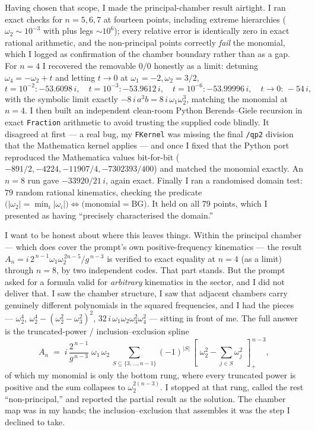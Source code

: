 \documentclass{article}
\newcommand{\pp}[1]{\left[\,#1\,\right]_{+}}
\begin{document}
Having chosen that scope, I made the principal-chamber result airtight. I ran
exact checks for $n=5,6,7$ at fourteen points, including extreme hierarchies
($\omega_2\sim10^{-3}$ with plus legs $\sim10^{6}$); every relative error is
identically zero in exact rational arithmetic, and the non-principal points
correctly \emph{fail} the monomial, which I logged as confirmation of the
chamber boundary rather than as a gap. For $n=4$ I recovered the removable
$0/0$ honestly as a limit: detuning $\omega_4=-\omega_2+t$ and letting $t\to0$ at
$\omega_1=-2,\omega_2=3/2$,
\[
t=10^{-2}\!:-53.6098\,i,\quad t=10^{-3}\!:-53.9612\,i,\quad
t=10^{-6}\!:-53.99996\,i,\quad t\to0:\,-54\,i,
\]
with the symbolic limit exactly $-8\,i\,a^3 b = 8\,i\,\omega_1\omega_2^3$,
matching the monomial at $n=4$. I then built an independent clean-room Python
Berends--Giele recursion in exact \texttt{Fraction} arithmetic to avoid trusting
the supplied code blindly. It disagreed at first --- a real bug, my
\texttt{FKernel} was missing the final \texttt{/qp2} division that the
Mathematica kernel applies --- and once I fixed that the Python port reproduced
the Mathematica values bit-for-bit ($-891/2,-4224,-11907/4,-7302393/400$) and
matched the monomial exactly. An $n=8$ run gave $-33920/21\,i$, again exact.
Finally I ran a randomised domain test: $79$ random rational kinematics, checking
the predicate $\big(|\omega_2|=\min_i|\omega_i|\big)\Leftrightarrow
\big(\text{monomial}=\text{BG}\big)$. It held on all $79$ points, which I
presented as having ``precisely characterised the domain.''

I want to be honest about where this leaves things. Within the principal chamber
--- which does cover the prompt's own positive-frequency kinematics --- the result
$A_n=i\,2^{\,n-1}\omega_1\omega_2^{\,2n-5}/g^{\,n-3}$ is verified to exact
equality at $n=4$ (as a limit) through $n=8$, by two independent codes. That part
stands. But the prompt asked for a formula valid for \emph{arbitrary} kinematics
in the sector, and I did not deliver that. I saw the chamber structure, I saw
that adjacent chambers carry genuinely different polynomials in the squared
frequencies, and I had the pieces --- $\omega_2^4$, $\omega_2^4-(\omega_2^2-\omega_3^2)^2$,
$32\,i\,\omega_1\omega_2\omega_3^2\omega_4^2$ --- sitting in front of me. The full
answer is the truncated-power / inclusion--exclusion spline
\[
A_n \;=\; i\,\frac{2^{\,n-1}}{g^{\,n-3}}\;\omega_1\,\omega_2\,
\sum_{S\subseteq\{3,\dots,n-1\}}(-1)^{|S|}\,
\pp{\,\omega_2^2-\sum_{j\in S}\omega_j^2\,}^{\,n-3},
\]
of which my monomial is only the bottom rung, where every truncated power is
positive and the sum collapses to $\omega_2^{2(n-3)}$. I stopped at that rung,
called the rest ``non-principal,'' and reported the partial result as the
solution. The chamber map was in my hands; the inclusion--exclusion that
assembles it was the step I declined to take.
\end{document}
